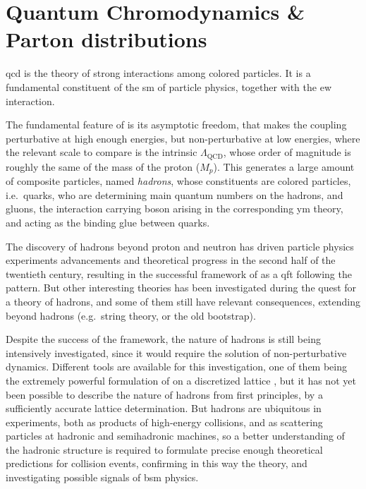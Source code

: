 
\chapter{Quantum Chromodynamics \& Parton distributions}
\label{ch:qcd}
\minitoc
\adjustmtc
\bigskip

\acrfull{qcd} is the theory of strong interactions among colored particles.
It is a fundamental constituent of the \acrfull{sm} of particle physics,
together with the \acrfull{ew} interaction.

The fundamental feature of \qcd is its asymptotic freedom, that makes the
coupling perturbative at high enough energies, but non-perturbative at low
energies, where the relevant scale to compare is the intrinsic
$\Lambda_{\text{QCD}}$, whose order of magnitude is roughly the same of the
mass of the proton ($M_p$).
%
This generates a large amount of composite particles, named \textit{hadrons},
whose constituents are colored particles, i.e.\ quarks, who are determining
main quantum numbers on the hadrons, and gluons, the interaction carrying boson
arising in the corresponding \acrfull{ym} theory, and acting as the binding
glue between quarks.

The discovery of hadrons beyond proton and neutron has driven particle physics
experiments advancements and theoretical progress in the second half of the
twentieth century, resulting in the successful framework of \qcd as a
\acrlong{qft} following the \ym pattern.
But other interesting theories has been investigated during the quest for a
theory of hadrons, and some of them still have relevant consequences, extending
beyond hadrons (e.g.\ string theory, or the old bootstrap).

Despite the success of the framework, the nature of hadrons is still being
intensively investigated, since it would require the solution of
non-perturbative \qcd dynamics.
%
Different tools are available for this investigation, one of them being the
extremely powerful formulation of \qcd on a discretized lattice
\cite{Wilson:1974sk}, but it has not yet been possible to describe the nature
of hadrons from first principles, by a sufficiently accurate lattice
determination.
%
But hadrons are ubiquitous in \hep experiments, both as products of high-energy
collisions, and as scattering particles at hadronic and semihadronic machines,
so a better understanding of the hadronic structure is required to formulate
precise enough theoretical predictions for collision events, confirming in this
way the \sm theory, and investigating possible signals of \acrfull{bsm}
physics.

